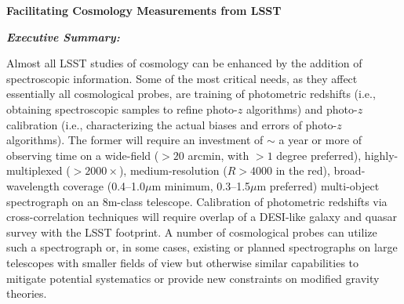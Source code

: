 \documentclass[12pt]{report}
\begin{document}
\pagestyle{fancy}
\fancyfoot{}%
\fancyfoot[R]{\thepage}  %

\fancyhead[R]{}
\renewcommand{\footrulewidth}{1pt}


\begin{centering}
{\huge{\bf{{Facilitating Cosmology Measurements from LSST}}}}


{\it{\bf Executive Summary:}}
\end{centering}
%

Almost all LSST studies of cosmology can be enhanced by the addition of spectroscopic information.  Some of the most critical needs, as they affect essentially all cosmological probes, are training of photometric redshifts (i.e., obtaining spectroscopic samples to refine photo-$z$ algorithms) and photo-$z$ calibration (i.e., characterizing the actual biases and errors of photo-$z$ algorithms).  The former will require an investment of $\sim$ a year or more of observing time on a wide-field ($>20$ arcmin, with $>1$ degree preferred), highly-multiplexed ($>2000\times$), medium-resolution ($R>4000$ in the red), broad-wavelength coverage (0.4--1.0$\mu$m minimum, 0.3--1.5$\mu$m preferred) multi-object spectrograph on an 8m-class telescope.  Calibration of photometric redshifts via cross-correlation techniques will require overlap of a DESI-like galaxy and quasar survey with the LSST footprint.  A number of cosmological probes can utilize such a spectrograph or, in some cases, existing or planned spectrographs on large telescopes with smaller fields of view but otherwise similar capabilities to mitigate potential systematics or provide new constraints on modified gravity theories.
\end{document}

